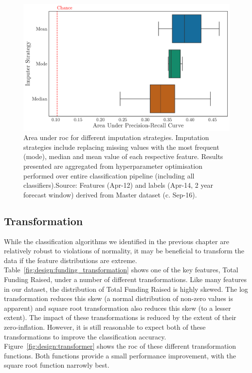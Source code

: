 \documentclass[../thesis/thesis.tex]{subfiles}
\begin{document}
\begin{figure}[!htb]
    \centering
    \includegraphics[width=\textwidth]{../figures/design/imputer}
    \caption[Area under PR Curves by imputation strategy]{Area under \gls{roc} for different imputation strategies. Imputation strategies include replacing missing values with the most frequent (mode), median and mean value of each respective feature. Results presented are aggregated from hyperparameter optimisation performed over entire classification pipeline (including all classifiers).Source: Features (Apr-12) and labels (Apr-14, 2 year forecast window) derived from Master dataset (c. Sep-16).}
    \label{fig:design:imputer}
\end{figure}

\subsection{Transformation}

While the classification algorithms we identified in the previous chapter are relatively robust to violations of normality, it may be beneficial to transform the data if the feature distributions are extreme. Table~\ref{fig:design:funding_transformation} shows one of the key features, Total Funding Raised, under a number of different transformations. Like many features in our dataset, the distribution of Total Funding Raised is highly skewed. The log transformation reduces this skew (a normal distribution of non-zero values is apparent) and square root transformation also reduces this skew (to a lesser extent). The impact of these transformations is reduced by the extent of their zero-inflation. However, it is still reasonable to expect both of these transformations to improve the classification accuracy. Figure~\ref{fig:design:transformer} shows the \gls{roc} of these different transformation functions. Both functions provide a small performance improvement, with the square root function narrowly best.
\end{document}
